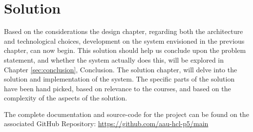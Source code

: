 \chapter{Solution}

Based on the considerations the design chapter, regarding both the architecture and technological choices, development on the system envisioned in the previous chapter, can now begin.
This solution should help us conclude upon the problem statement, and whether the system actually does this, will be explored in Chapter \ref{sec:conclusion}, Conclusion.
The solution chapter, will delve into the solution and implementation of the system.
The specific parts of the solution have been hand picked, based on relevance to the courses, and based on the complexity of the aspects of the solution.

The complete documentation and source-code for the project can be found on the associated GitHub Repository: \url{https://github.com/aau-hcl-p5/main}



%





